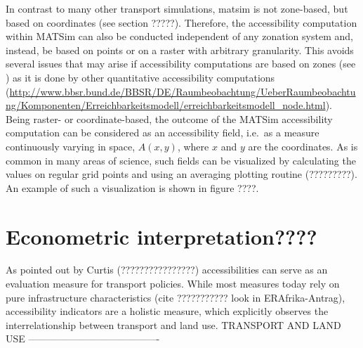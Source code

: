 In contrast to many other transport simulations, \gls{matsim} is not zone-based, but based on coordinates (see section ?????). Therefore, the accessibility computation within MATSim can also be conducted independent of any zonation system and, instead, be based on points or on a raster with arbitrary granularity. This avoids several issues that may arise if accessibility computations are based on zones (see \citep[e.g.,][]{NicolaiNagel2012HiResAccessibilityMethodInBook}) as it is done by other quantitative accessibility computations 
%
%
(\url{http://www.bbsr.bund.de/BBSR/DE/Raumbeobachtung/UeberRaumbeobachtung/Komponenten/Erreichbarkeitsmodell/erreichbarkeitsmodell_node.html}). Being raster- or coordinate-based, the outcome of the MATSim accessibility computation can be considered as an accessibility field,
i.e.\ as a measure continuously varying in space, $A(x,y)$, where $x$ and $y$
are the coordinates. As is common in many areas of science, such
fields can be visualized by calculating the values on regular grid
points and using an averaging plotting routine (?????????). An example of such a visualization is shown in figure ????.




\section{Econometric interpretation????}

As pointed out by Curtis (????????????????) accessibilities can serve as an evaluation measure for transport policies. While most measures today rely on pure infrastructure characteristics (cite ??????????? look in ERAfrika-Antrag), accessibility indicators are a holistic measure, which explicitly observes the interrelationship between transport and land use.
TRANSPORT AND LAND USE ----------------------------------------

